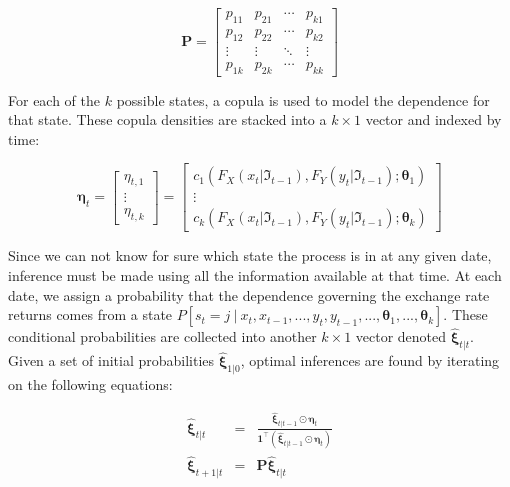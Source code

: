 \documentclass[12pt]{article}
\newcommand{\boldXi}{\hat{\boldsymbol{\xi}}}
\begin{document}
\begin{equation}
\mathbf{P}=\left[ 
\begin{array}{cccc}
p_{11} & p_{21} & \cdots & p_{k1} \\ 
p_{12} & p_{22} & \cdots & p_{k2} \\ 
\vdots & \vdots & \ddots & \vdots \\ 
p_{1k} & p_{2k} & \cdots & p_{kk}
\end{array}
\right]
\end{equation}

For each of the $k$ possible states, a copula is used to model the
dependence for that state. These copula densities are stacked into a
$k\times 1$ vector and indexed by time:

\begin{equation}
\boldsymbol{\eta}_{t} = \left[ 
\begin{array}{c}
\eta _{t,1} \\ 
\vdots \\ 
\eta _{t,k}
\end{array}
\right] = \left[
\begin{array}{c}
c_{1}\left(F_{X}\left(x_{t} | \Im_{t-1}\right), F_{Y}\left(y_{t} | \Im_{t-1}\right) ;\mathbf{\theta}_{1}\right) \\ 
\vdots \\ 
c_{k}\left(F_{X}\left(x_{t} | \Im_{t-1}\right), F_{Y}\left(y_{t} | \Im_{t-1}\right) ;\mathbf{\theta }_{k}\right)
\end{array}
\right]
\end{equation}

Since we can not know for sure which state the process is in at any given
date, inference must be made using all the information available at that
time. At each date, we assign a probability that the dependence governing
the exchange rate returns comes from a state
$P\left[s_{t}=j~|~x_{t},x_{t-1},...,y_{t},y_{t-1},...,\mathbf{\theta}_{1},...,\mathbf{\theta}_{k}\right]$.
These conditional probabilities are collected into another $k\times 1$
vector denoted $\boldXi_{t|t}$. Given a set of initial probabilities
$\boldXi_{1|0}$, optimal inferences are found by iterating on the
following equations:

\begin{eqnarray}
\boldXi_{t|t} &=& \frac{\boldXi_{t|t-1}\odot\boldsymbol{\eta}_{t}}{\mathbf{1}^{\top}\left(\boldXi_{t|t-1}\odot \boldsymbol{\eta}_{t}\right)} \\
\boldXi_{t+1|t} &=& \mathbf{P} \boldXi_{t|t}
\end{eqnarray}
\end{document}
